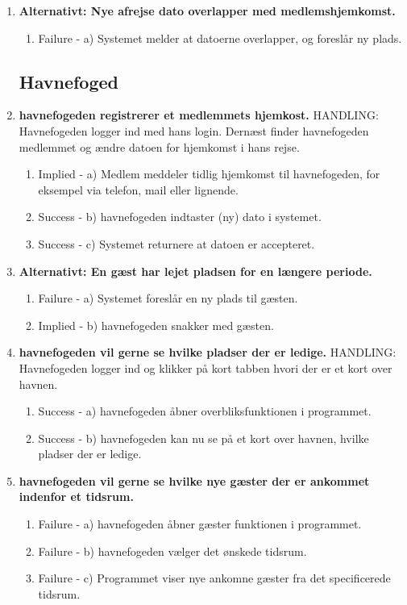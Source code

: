 \begin{enumerate}
	\item{\bf{Alternativt: Nye afrejse dato overlapper med medlemshjemkomst.}}
	  \begin{enumerate}
			\item Failure -  a) Systemet melder at datoerne overlapper, og foreslår ny plads.
	   \end{enumerate}

\subsection{Havnefoged}
	\item{\bf{havnefogeden registrerer et medlemmets hjemkost.}}
		HANDLING: Havnefogeden logger ind med hans login. Dernæst finder havnefogeden medlemmet og ændre datoen for hjemkomst i hans rejse.
	  \begin{enumerate}
			\item Implied -  a) Medlem meddeler tidlig hjemkomst til havnefogeden, for eksempel via telefon, mail eller lignende.
			\item Success -  b) havnefogeden indtaster (ny) dato i systemet.
			\item Success -  c) Systemet returnere at datoen er accepteret.
	   \end{enumerate}

	\item{\bf{Alternativt: En gæst har lejet pladsen for en længere periode.}}
	 \begin{enumerate}
			\item Failure -  a) Systemet foreslår en ny plads til gæsten.
			\item Implied -  b) havnefogeden snakker med gæsten.
	   \end{enumerate}
      
	\item{\bf{havnefogeden vil gerne se hvilke pladser der er ledige.}}
		HANDLING: Havnefogeden logger ind og klikker på kort tabben hvori der er et kort over havnen.
	  \begin{enumerate}
			\item Success -  a) havnefogeden åbner overbliksfunktionen i programmet.
			\item Success -  b) havnefogeden kan nu se på et kort over havnen, hvilke pladser der er ledige.
	   \end{enumerate}
      
	\item{\bf{havnefogeden vil gerne se hvilke nye gæster der er ankommet indenfor et tidsrum.}}
	  \begin{enumerate}
			\item Failure -  a) havnefogeden åbner gæster funktionen i programmet.
			\item Failure -  b) havnefogeden vælger det ønskede tidsrum.
			\item Failure -  c) Programmet viser nye ankomne gæster fra det specificerede tidsrum.
	   \end{enumerate}
  

\end{enumerate}
